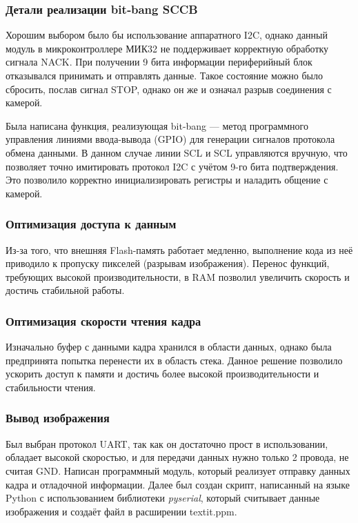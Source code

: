 \documentclass[a4paper]{article}
\begin{document}
    \subsubsection{Детали реализации bit‑bang SCCB}
    Хорошим выбором было бы использование аппаратного I2C, однако данный модуль в микроконтроллере МИК32 не поддерживает корректную обработку сигнала NACK. 
    При получении 9 бита информации периферийный блок отказывался принимать и отправлять данные. 
    Такое состояние можно было сбросить, послав сигнал STOP, однако он же и означал разрыв соединения с камерой.

    Была написана функция, реализующая bit-bang — метод программного управления линиями ввода-вывода (GPIO) для генерации сигналов протокола обмена данными.
    В данном случае линии SCL и SCL управляются вручную, что позволяет точно имитировать протокол I2C с учётом 9-го бита подтверждения.
    Это позволило корректно инициализировать регистры и наладить общение с камерой.

    \subsubsection{Оптимизация доступа к данным}
    Из-за того, что внешняя Flash-память работает медленно, выполнение кода из неё приводило к пропуску пикселей (разрывам изображения).
    Перенос функций, требующих высокой производительности, в RAM позволил увеличить скорость и достичь стабильной работы.


    \subsubsection{Оптимизация скорости чтения кадра}
    Изначально буфер с данными кадра хранился в области данных, однако была предпринята попытка перенести их в область стека.
    Данное решение позволило ускорить доступ к памяти и достичь более высокой производительности и стабильности чтения.

    \subsubsection{Вывод изображения}
    Был выбран протокол UART, так как он достаточно прост в использовании, обладает высокой скоростью, и для передачи данных нужно только 2 провода, не считая GND.
    Написан программный модуль, который реализует отправку данных кадра и отладочной информации.
    Далее был создан скрипт, написанный на языке Python с использованием библиотеки \textit{pyserial}, который считывает данные изображения и создаёт файл в расширении textit{.ppm}.
\end{document}
